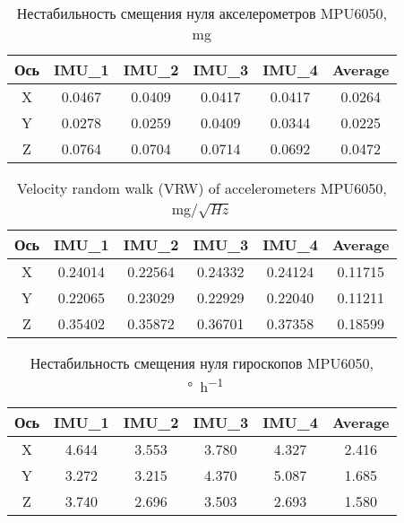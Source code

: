 \begin{table}[h!]
	\centering
	\caption{Нестабильность смещения нуля акселерометров MPU6050, mg}
	\begin{tabular}{| c | c | c | c | c | c |}
	\hline
	Ось & IMU\_1 & IMU\_2 & IMU\_3 & IMU\_4 & Average \\ \hline
	X & 0.0467 & 0.0409 & 0.0417 & 0.0417 & 0.0264 \\ \hline
	Y & 0.0278 & 0.0259 & 0.0409 & 0.0344 & 0.0225 \\ \hline
	Z & 0.0764 & 0.0704 & 0.0714 & 0.0692 & 0.0472 \\
	\hline
	\end{tabular}
	\label{table:acc_bias}
\end{table}

\begin{table}[h!]
	\centering
	\caption{Velocity random walk (VRW) of accelerometers MPU6050, mg/$\sqrt{Hz}$}
	\begin{tabular}{| c | c | c | c | c | c |}
	\hline
	Ось & IMU\_1 & IMU\_2 & IMU\_3 & IMU\_4 & Average \\ \hline
	X & 0.24014 & 0.22564 & 0.24332 & 0.24124 & 0.11715 \\ \hline
	Y & 0.22065 & 0.23029 & 0.22929 & 0.22040 & 0.11211 \\ \hline
	Z & 0.35402 & 0.35872 & 0.36701 & 0.37358 & 0.18599 \\
	\hline
	\end{tabular}
	\label{table:acc_vrw}
\end{table}



\begin{table}[h!]
	\centering
	\caption{Нестабильность смещения нуля гироскопов MPU6050, \SI[per-mode=symbol]{}{\degree\per\hour}}
	\begin{tabular}{| c | c | c | c | c | c |}
	\hline
	Ось & IMU\_1 & IMU\_2 & IMU\_3 & IMU\_4 & Average \\ \hline
	X & 4.644 & 3.553 & 3.780 & 4.327 & 2.416 \\ \hline
	Y & 3.272 & 3.215 & 4.370 & 5.087 & 1.685 \\ \hline
	Z & 3.740 & 2.696 & 3.503 & 2.693 & 1.580 \\
	\hline
	\end{tabular}
	\label{table:gyro_bias}
\end{table}

